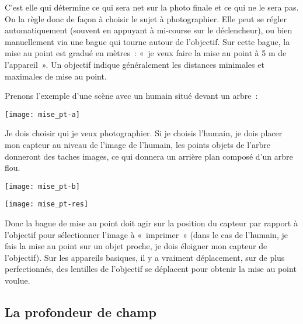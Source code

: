 \documentclass[../main/main.tex]{subfiles}
\begin{document}
C'est elle qui détermine ce qui sera net sur la photo finale et ce qui ne le
sera pas. On la règle donc de façon à choisir le sujet à photographier. Elle
peut se régler automatiquement (souvent en appuyant à mi-course sur le
déclencheur), ou bien manuellement via une bague qui tourne autour de
l'objectif. Sur cette bague, la mise au point est gradué en mètres~: «~je veux
faire la mise au point à 5 m de l'appareil~». Un objectif indique généralement
les distances minimales et maximales de mise au point. 

Prenons l'exemple d'une scène avec un humain situé devant un arbre~:

\begin{minipage}{0.53\linewidth}
    \begin{center}
        \texttt{[image: mise\_pt-a]}
    \end{center}    
\end{minipage}
\hfill
\begin{minipage}{0.45\linewidth}
    Je dois choisir qui je veux photographier. Si je choisis l'humain, je dois
    placer mon capteur au niveau de l'image de l'humain, les points objets de
    l'arbre donneront des taches images, ce qui donnera un arrière plan composé
    d'un arbre flou.
\end{minipage}

\begin{minipage}[c]{0.59\linewidth}
    \begin{center}
        \texttt{[image: mise\_pt-b]}
    \end{center}
\end{minipage}\hfill 
\begin{minipage}[c]{0.31\linewidth}
    \begin{center}
        \texttt{[image: mise\_pt-res]}
    \end{center}
\end{minipage}

Donc la bague de mise au point doit agir sur la position du capteur par rapport
à l'objectif pour sélectionner l'image à «~imprimer~» (dans le cas de l'humain,
je fais la mise au point sur un objet proche, je dois éloigner mon capteur de
l'objectif). Sur les appareils basiques, il y a vraiment déplacement, sur de
plus perfectionnés, des lentilles de l'objectif se déplacent pour obtenir la
mise au point voulue.

\subsection{La profondeur de champ}
\end{document}
